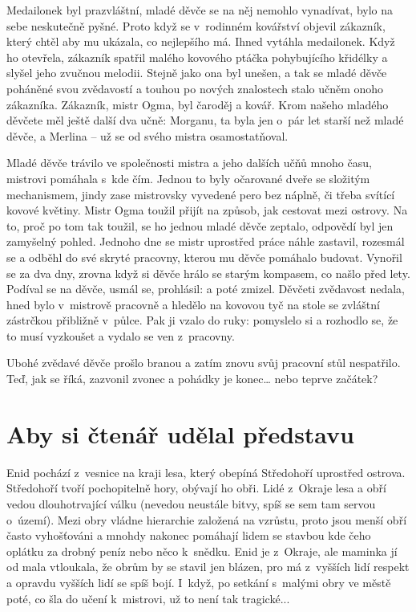 \documentclass[a4paper,twocolumn,openany,nodeprecatedcode, justified]{dndbook}
\begin{document}
	Medailonek byl prazvláštní, mladé děvče se na něj nemohlo vynadívat, bylo na sebe neskutečně pyšné. Proto když se v~rodinném kovářství objevil zákazník, který chtěl aby mu ukázala, co nejlepšího má. Ihned vytáhla medailonek. Když ho otevřela, zákazník spatřil malého kovového ptáčka pohybujícího křidélky a slyšel jeho zvučnou melodii. Stejně jako ona byl unešen, a tak se mladé děvče poháněné svou zvědavostí a touhou po nových znalostech stalo učněm onoho zákazníka. Zákazník, mistr Ogma, byl čaroděj a kovář. Krom našeho mladého děvčete měl ještě další dva učně: Morganu, ta byla jen o~pár let starší než mladé děvče, a Merlina -- už se od svého mistra osamostatňoval.
	
	Mladé děvče trávilo ve společnosti mistra a jeho dalších učňů mnoho času, mistrovi pomáhala s~kde čím. Jednou to byly očarované dveře se složitým mechanismem, jindy zase mistrovsky vyvedené pero bez náplně, či třeba svítící kovové květiny. Mistr Ogma toužil přijít na způsob, jak cestovat mezi ostrovy. Na to, proč po tom tak toužil, se ho jednou mladé děvče zeptalo, odpovědí byl jen zamyšelný pohled. Jednoho dne se mistr uprostřed práce náhle zastavil, rozesmál se a odběhl do své skryté pracovny, kterou mu děvče pomáhalo budovat. Vynořil se za dva dny, zrovna když si děvče hrálo se starým kompasem, co našlo před lety. Podíval se na děvče, usmál se, prohlásil:  a poté zmizel. Děvčeti zvědavost nedala, hned bylo v~mistrově pracovně a hledělo na kovovou tyč na stole se zvláštní zástrčkou přibližně v~půlce. Pak ji vzalo do ruky:  pomyslelo si a rozhodlo se, že to musí vyzkoušet a vydalo se ven z~pracovny.	
	
	Ubohé zvědavé děvče prošlo branou a zatím znovu svůj pracovní stůl nespatřilo. Teď, jak se říká, zazvonil zvonec a pohádky je konec… nebo teprve začátek?
	
	\section*{Aby si čtenář udělal představu}
	Enid pochází z~vesnice na kraji lesa, který obepíná Středohoří uprostřed ostrova. Středohoří tvoří pochopitelně hory, obývají ho obři. Lidé z~Okraje lesa a obří vedou dlouhotrvající válku (nevedou neustále bitvy, spíš se sem tam servou o~území). Mezi obry vládne hierarchie založená na vzrůstu, proto jsou menší obří často vyhošťováni a mnohdy nakonec pomáhají lidem se stavbou kde čeho oplátku za drobný peníz nebo něco k~snědku. Enid je z~Okraje, ale maminka jí od mala vtloukala, že obrům by se stavil jen blázen, pro má z~vyšších lidí respekt a opravdu vyšších lidí se spíš bojí. I~když, po setkání s~malými obry ve městě poté, co šla do učení k~mistrovi, už to není tak tragické...
	
\end{document}
